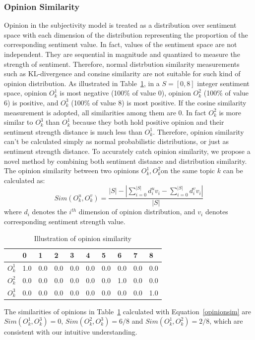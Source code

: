 \documentclass[letterpaper]{article}
\begin{document}
\subsubsection{Opinion Similarity}
\label{opsim}

Opinion in the subjectivity model is treated  as a distribution over sentiment space with each dimension of the distribution representing the proportion of the corresponding sentiment value. 
In fact, values of the sentiment space are not independent. 
They are sequential in magnitude and quantized to measure the strength of sentiment. Therefore, normal distrbution similarity measurements such as KL-divergence and consine similarity are not suitable for such kind of opinion distribution. As illustrated in Table~\ref{tab1}, in a $ S=[0,8 ] $ integer sentiment space, opinion $ O_{k}^{1} $ is most negative (100\% of value 0), opinion $ O_{k}^{2} $ (100\% of value 6) is positive, and $ O_{k}^{3} $ (100\% of value 8) is most positive.
If the cosine similarity measurement is adopted, all similarities among them are 0.
In fact $ O_{k}^{2} $ is more similar to $ O_{k}^{3} $ than $O_{k}^{1} $ because they both hold positive opinion and their sentiment strength distance is much less than $ O_{k}^{1} $.  
Therefore, opinion similarity can't be calculated simply as normal probabilistic distributions, or just as sentiment strength distance. 
To accurately catch opinion similarity, we propose a novel method by combining both sentiment distance and distribution similarity.
The opinion similarity between two opinions $O_{k}^{1},O_{k}^{2} $on the same topic $ k $ can be calculated as: 
\begin{equation}
\label{opinionsim}
Sim(O_{k}^{u},O_{k}^{v})=\dfrac{|S|-|\sum_{i=0}^{|S|}d_{i}^{u}v_{i}-\sum_{i=0}^{|S|}d_{i}^{v}v_{i}|}{|S|}
\end{equation}
where $ d_{i} $ denotes the $ i^{th} $ dimension of opinion distribution, and $ v_{i} $ denotes corresponding sentiment strength value. 
\begin{table}[htb]
\scriptsize
\centering
\caption{Illustration of opinion similarity}
\label{tab1}
\begin{tabular}{|l|l|l|l|l|l|l|l|l|l|}
\hline
 & 0 & 1& 2 & 3 & 4 & 5 & 6 & 7 & 8 \\
\hline
$O_{k}^{1}$ & 1.0 & 0.0 & 0.0 & 0.0 & 0.0 & 0.0 & 0.0 & 0.0 & 0.0 \\
\hline
$O_{k}^{2}$ & 0.0 & 0.0 & 0.0 & 0.0 & 0.0 & 0.0 & 1.0 & 0.0 & 0.0 \\
\hline
$O_{k}^{3}$ & 0.0 & 0.0 & 0.0 & 0.0 & 0.0 & 0.0 & 0.0 & 0.0 & 1.0 \\
\hline
\end{tabular}
\end{table} 
The similarities of opinions in Table~\ref{tab1} calculated with Equation~\ref{opinionsim} are $ Sim(O_{k}^{1},O_{k}^{3})=0 $, $ Sim(O_{k}^{2},O_{k}^{3})=6/8 $ and $ Sim(O_{k}^{1},O_{k}^{2})=2/8 $, which are consistent with our intuitive understanding. 
\end{document}
